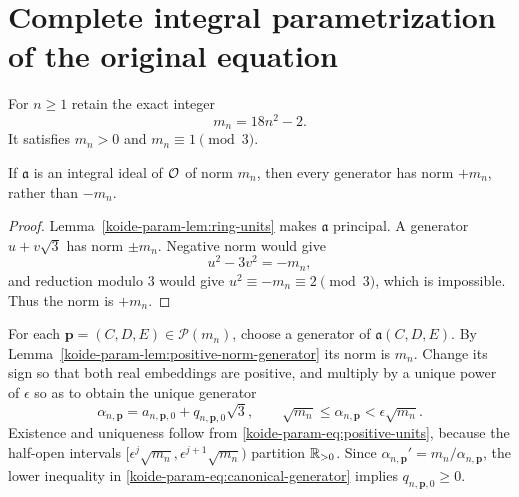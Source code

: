 \section{Complete integral parametrization of the original equation}

For $n\geq1$ retain the exact integer
\begin{equation}
 m_n=18n^2-2.
 \label{koide-param-eq:mn}
\end{equation}
It satisfies $m_n>0$ and $m_n\equiv1\pmod3$.

\begin{lemma}
\label{koide-param-lem:positive-norm-generator}
If $\mathfrak a$ is an integral ideal of $\mathcal O$ of norm $m_n$, then every
generator has norm $+m_n$, rather than $-m_n$.
\end{lemma}

\begin{proof}
Lemma~\ref{koide-param-lem:ring-units} makes $\mathfrak a$ principal.  A generator
$u+v\sqrt3$ has norm $\pm m_n$.  Negative norm would give
\[
 u^2-3v^2=-m_n,
\]
and reduction modulo $3$ would give
$u^2\equiv-m_n\equiv2\pmod3$, which is impossible.  Thus the norm is
$+m_n$.
\end{proof}

For each $\mathbf p=(C,D,E)\in\mathcal P(m_n)$, choose a generator of
$\mathfrak a(C,D,E)$.  By Lemma~\ref{koide-param-lem:positive-norm-generator} its
norm is $m_n$.  Change its sign so that both real embeddings are positive,
and multiply by a unique power of $\epsilon$ so as to obtain the unique
generator
\begin{equation}
 \alpha_{n,\mathbf p}=a_{n,\mathbf p,0}
   +q_{n,\mathbf p,0}\sqrt3,
 \qquad
 \sqrt{m_n}\leq\alpha_{n,\mathbf p}
       <\epsilon\sqrt{m_n}.
 \label{koide-param-eq:canonical-generator}
\end{equation}
Existence and uniqueness follow from
\eqref{koide-param-eq:positive-units}, because the half-open intervals
$[\epsilon^j\sqrt{m_n},\epsilon^{j+1}\sqrt{m_n})$ partition
$\mathbb R_{>0}$.  Since
$\alpha_{n,\mathbf p}'=m_n/\alpha_{n,\mathbf p}$, the lower inequality
in \eqref{koide-param-eq:canonical-generator} implies
$q_{n,\mathbf p,0}\geq0$.

